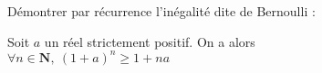 \documentclass[varwidth,convert]{standalone}
\begin{document}
Démontrer par récurrence l'inégalité dite de Bernoulli :

{\center Soit $a$ un réel strictement positif. On a alors \\
$\forall n \in\mathbf{N},\ \left(1+a\right)^n \geq 1 + na$}
\end{document}
